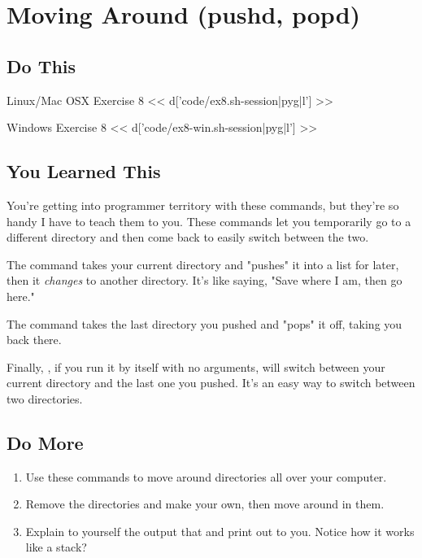 \chapter{Moving Around (pushd, popd)}

\section{Do This}

\begin{code}{Linux/Mac OSX Exercise 8}
<< d['code/ex8.sh-session|pyg|l'] >>
\end{code}

\begin{code}{Windows Exercise 8}
<< d['code/ex8-win.sh-session|pyg|l'] >>
\end{code}

\section{You Learned This}

You're getting into programmer territory with these commands, but they're so
handy I have to teach them to you.  These commands let you temporarily go
to a different directory and then come back to easily switch between the
two.

The  command takes your current directory and "pushes" it
into a list for later, then it \emph{changes} to another directory.  It's
like saying, "Save where I am, then go here."

The  command takes the last directory you pushed and "pops"
it off, taking you back there.

Finally, , if you run it by itself with no arguments, will
switch between your current directory and the last one you pushed.  It's
an easy way to switch between two directories.

\section{Do More}

\begin{enumerate}
\item Use these commands to move around directories all over your
    computer.
\item Remove the  directories and make your own, then
    move around in them.
\item Explain to yourself the output that  and 
    print out to you.  Notice how it works like a stack?
\end{enumerate}

